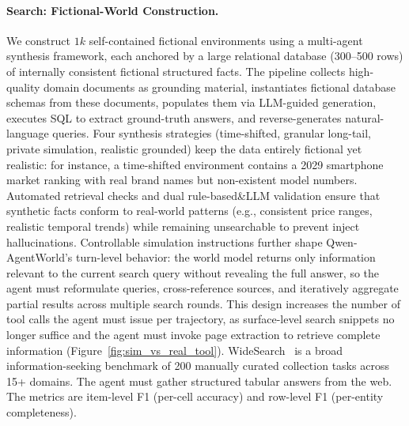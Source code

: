 \documentclass{llmxive}
\providecommand{\method}{Qwen-AgentWorld\xspace}
\begin{document}
\paragraph{Search: Fictional-World Construction.}
We construct $1k$ self-contained fictional environments using a multi-agent synthesis framework, each anchored by a large relational database (300--500 rows) of internally consistent fictional structured facts.
The pipeline collects high-quality domain documents as grounding material, instantiates fictional database schemas from these documents, populates them via LLM-guided generation, executes SQL to extract ground-truth answers, and reverse-generates natural-language queries.
Four synthesis strategies (time-shifted, granular long-tail, private simulation, realistic grounded) keep the data entirely fictional yet realistic: for instance, a time-shifted environment contains a 2029 smartphone market ranking with real brand names but non-existent model numbers.
Automated retrieval checks and dual rule-based\&LLM validation ensure that synthetic facts conform to real-world patterns (e.g., consistent price ranges, realistic temporal trends) while remaining unsearchable to prevent inject hallucinations.
Controllable simulation instructions further shape \method's turn-level behavior: the world model returns only information relevant to the current search query without revealing the full answer, so the agent must reformulate queries, cross-reference sources, and iteratively aggregate partial results across multiple search rounds.
This design increases the number of tool calls the agent must issue per trajectory, as surface-level search snippets no longer suffice and the agent must invoke page extraction to retrieve complete information (Figure~\ref{fig:sim_vs_real_tool}).
WideSearch~\citep{wong2025widesearch} is a broad information-seeking benchmark of 200 manually curated collection tasks across 15+ domains.
The agent must gather structured tabular answers from the web. The metrics are item-level F1 (per-cell accuracy) and row-level F1 (per-entity completeness).
\end{document}
